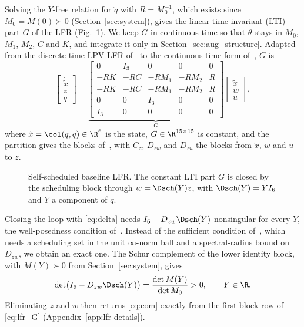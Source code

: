 Solving the $Y$-free relation for $\ddot q$ with $R=M_0^{-1}$, which exists
since $M_0=M(0)\succ0$ (Section~\ref{sec:system}), gives the linear
time-invariant (LTI) part $G$ of the LFR (Fig.~\ref{fig:lfr}).
We keep $G$ in continuous time so that $\theta$ stays in $M_0$, $M_1$, $M_2$,
$C$ and $K$, and integrate it only in Section~\ref{sec:aug_structure}.
Adapted from the discrete-time LPV-LFR of~\cite[Eq.~(6)]{drenth2025lpvlfr} to
the continuous-time form of~\cite[Eq.~(2.1)]{drenth2025thesis}, $G$ is
{\footnotesize
\setlength{\arraycolsep}{2.5pt}
\begin{equation}
  \begin{bmatrix}\dot{\tilde x}\\ z\\ q\end{bmatrix}
  =\underbrace{\left[\begin{array}{cc|cc|c}
   0&I_3&0&0&0\\
   -RK&-RC&-RM_1&-RM_2&R\\ \hline
   -RK&-RC&-RM_1&-RM_2&R\\
   0&0&I_3&0&0\\ \hline
   I_3&0&0&0&0
  \end{array}\right]}_{G}
  \begin{bmatrix}\tilde x\\ w\\ u\end{bmatrix},
  \label{eq:lfr_G}
\end{equation}
}
where $\tilde x=\col(q,\dot q)\in\R^6$ is the state, $G\in\R^{15\times15}$ is
constant, and the partition gives the blocks
of~\cite[Eq.~(2.1)]{drenth2025thesis}, with $C_z$, $D_{zw}$ and $D_{zu}$ the
blocks from $\tilde x$, $w$ and $u$ to $z$.

\begin{figure}[t]
  \centering
  
  \caption{Self-scheduled baseline LFR. The constant LTI part $G$ is closed by
  the scheduling block through $w=\Dsch(Y)z$, with $\Dsch(Y)=YI_6$ and $Y$ a
  component of $q$.}
  \label{fig:lfr}
\end{figure}

Closing the loop with \eqref{eq:delta} needs $I_6-D_{zw}\Dsch(Y)$ nonsingular
for every $Y$, the well-posedness condition
of~\cite[Sec.~2.1]{drenth2025thesis}.
Instead of the sufficient condition of~\cite[Thm.~6]{drenth2025lpvlfr}, which
needs a scheduling set in the unit $\infty$-norm ball and a spectral-radius
bound on $D_{zw}$, we obtain an exact one.
The Schur complement of the lower identity block, with $M(Y)\succ0$ from
Section~\ref{sec:system}, gives
\begin{equation}
  \det\bigl(I_6-D_{zw}\Dsch(Y)\bigr)=\frac{\det M(Y)}{\det M_0}>0,
  \qquad Y\in\R.
  \label{eq:wellposed}
\end{equation}
Eliminating $z$ and $w$ then returns \eqref{eq:eom} exactly from the first
block row of \eqref{eq:lfr_G} (Appendix~\ref{app:lfr-details}).

